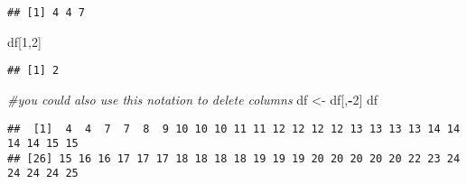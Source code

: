 \documentclass[
]{article}
\newenvironment{Shaded}{\begin{snugshade}}{\end{snugshade}}
\newcommand{\CommentTok}[1]{\textcolor[rgb]{0.56,0.35,0.01}{\textit{#1}}}
\newcommand{\DecValTok}[1]{\textcolor[rgb]{0.00,0.00,0.81}{#1}}
\newcommand{\FunctionTok}[1]{\textcolor[rgb]{0.13,0.29,0.53}{\textbf{#1}}}
\newcommand{\NormalTok}[1]{#1}
\newcommand{\OtherTok}[1]{\textcolor[rgb]{0.56,0.35,0.01}{#1}}
\newcommand{\SpecialCharTok}[1]{\textcolor[rgb]{0.81,0.36,0.00}{\textbf{#1}}}
\begin{document}
\begin{Shaded}
\end{Shaded}

\begin{verbatim}
## [1] 4 4 7
\end{verbatim}

\begin{Shaded}
\begin{Highlighting}[]
\NormalTok{df[}\DecValTok{1}\NormalTok{,}\DecValTok{2}\NormalTok{]}
\end{Highlighting}
\end{Shaded}

\begin{verbatim}
## [1] 2
\end{verbatim}

\begin{Shaded}
\begin{Highlighting}[]
\CommentTok{\#you could also use this notation to delete columns}
\NormalTok{df }\OtherTok{\textless{}{-}}\NormalTok{ df[,}\SpecialCharTok{{-}}\DecValTok{2}\NormalTok{]}
\NormalTok{df}
\end{Highlighting}
\end{Shaded}

\begin{verbatim}
##  [1]  4  4  7  7  8  9 10 10 10 11 11 12 12 12 12 13 13 13 13 14 14 14 14 15 15
## [26] 15 16 16 17 17 17 18 18 18 18 19 19 19 20 20 20 20 20 22 23 24 24 24 24 25
\end{verbatim}
\end{document}
